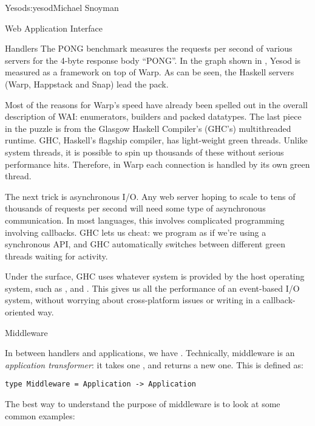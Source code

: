 \begin{aosachapter}{Yesod}{s:yesod}{Michael Snoyman}
\begin{aosasect1}{Web Application Interface}
\begin{aosasect2}{Handlers}
The PONG benchmark measures the requests per second of various servers
for the 4-byte response body ``PONG''. In the graph shown in , Yesod is measured
as a framework on top of Warp. As can be seen, the Haskell servers
(Warp, Happstack and Snap) lead the pack.


Most of the reasons for Warp's speed have already been spelled out in
the overall description of WAI: enumerators, builders and packed
datatypes. The last piece in the puzzle is from the Glasgow Haskell
Compiler's (GHC's) multithreaded runtime. GHC, Haskell's flagship
compiler, has light-weight green threads. Unlike system threads, it is
possible to spin up thousands of these without serious performance
hits. Therefore, in Warp each connection is handled by its own green
thread.

The next trick is asynchronous I/O. Any web server hoping to scale to
tens of thousands of requests per second will need some type of
asynchronous communication. In most languages, this involves
complicated programming involving callbacks. GHC lets us cheat: we
program as if we're using a synchronous API, and GHC automatically
switches between different green threads waiting for activity.

Under the surface, GHC uses whatever system is provided by the host
operating system, such as ,  and
. This gives us all the performance of an event-based I/O
system, without worrying about cross-platform issues or writing in a
callback-oriented way.

\end{aosasect2}

\begin{aosasect2}{Middleware}


In between handlers and applications, we have
. Technically, middleware is an \emph{application
  transformer}: it takes one , and returns a new one. This
is defined as:

\begin{verbatim}
type Middleware = Application -> Application
\end{verbatim}

\noindent The best way to understand the purpose of middleware is to look at
some common examples:


\end{aosasect2}
\end{aosasect1}
\end{aosachapter}
